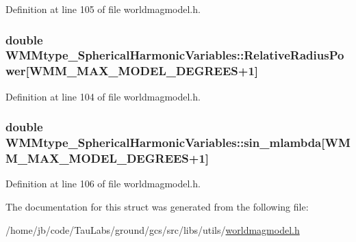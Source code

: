 \-Definition at line 105 of file worldmagmodel.\-h.

\hypertarget{struct_w_m_mtype___spherical_harmonic_variables_acb306412b3b73ab19d9b2218911de891}{
\subsubsection[{\-Relative\-Radius\-Power}]{\setlength{\rightskip}{0pt plus 5cm}double {\bf \-W\-M\-Mtype\-\_\-\-Spherical\-Harmonic\-Variables\-::\-Relative\-Radius\-Power}\mbox{[}\-W\-M\-M\-\_\-\-M\-A\-X\-\_\-\-M\-O\-D\-E\-L\-\_\-\-D\-E\-G\-R\-E\-E\-S+1\mbox{]}}}\label{struct_w_m_mtype___spherical_harmonic_variables_acb306412b3b73ab19d9b2218911de891}


\-Definition at line 104 of file worldmagmodel.\-h.

\hypertarget{struct_w_m_mtype___spherical_harmonic_variables_af6906ecd2a98bea39e7d43459d7399cb}{
\subsubsection[{sin\-\_\-mlambda}]{\setlength{\rightskip}{0pt plus 5cm}double {\bf \-W\-M\-Mtype\-\_\-\-Spherical\-Harmonic\-Variables\-::sin\-\_\-mlambda}\mbox{[}\-W\-M\-M\-\_\-\-M\-A\-X\-\_\-\-M\-O\-D\-E\-L\-\_\-\-D\-E\-G\-R\-E\-E\-S+1\mbox{]}}}\label{struct_w_m_mtype___spherical_harmonic_variables_af6906ecd2a98bea39e7d43459d7399cb}


\-Definition at line 106 of file worldmagmodel.\-h.



\-The documentation for this struct was generated from the following file\-:\begin{DoxyCompactItemize}
\item 
/home/jb/code/\-Tau\-Labs/ground/gcs/src/libs/utils/\hyperlink{worldmagmodel_8h}{worldmagmodel.\-h}\end{DoxyCompactItemize}
